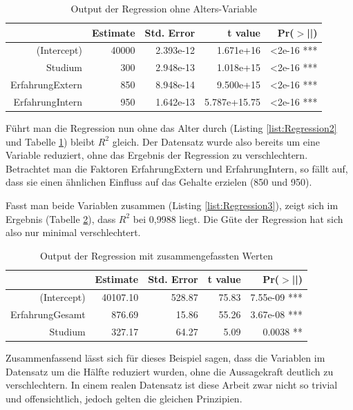 
\begin{table}[h!]
\begin{tabular}{rrrrr}
  \hline
 & Estimate & Std. Error & t value & Pr($>$||) \\ 
  \hline
(Intercept) & 40000 & 2.393e-12 & 1.671e+16 & <2e-16 *** \\ 
  Studium & 300 & 2.948e-13 & 1.018e+15 & <2e-16 *** \\ 
  ErfahrungExtern & 850 & 8.948e-14 & 9.500e+15 & <2e-16 *** \\ 
  ErfahrungIntern & 950 & 1.642e-13 & 5.787e+15.75 & <2e-16 *** \\ 
\hline
\end{tabular}
\caption{Output der Regression ohne Alters-Variable}
\label{tab:Regression2:output}
\end{table}
Führt man die Regression nun ohne das Alter durch (Listing \ref{list:Regression2} und Tabelle \ref{tab:Regression2:output}) bleibt $R^2$ gleich. Der Datensatz wurde also bereits um eine Variable reduziert, ohne das Ergebnis der Regression zu verschlechtern.\newline
Betrachtet man die Faktoren ErfahrungExtern und ErfahrungIntern, so fällt auf, dass sie einen ähnlichen Einfluss auf das Gehalte erzielen (850 und 950). 

Fasst man beide Variablen zusammen (Listing \ref{list:Regression3}), zeigt sich im Ergebnis (Tabelle \ref{tab:Regression3:output}), dass $R^2$ bei 0,9988 liegt. Die Güte der Regression hat sich also nur minimal verschlechtert.
\begin{table}[h!]
\begin{tabular}{rrrrr}
  \hline
 & Estimate & Std. Error & t value & Pr($>$||) \\ 
  \hline
(Intercept) & 40107.10 & 528.87 & 75.83 & 7.55e-09 *** \\
ErfahrungGesamt & 876.69 & 15.86 & 55.26 & 3.67e-08 ***\\ 
Studium & 327.17 & 64.27 & 5.09 & 0.0038 **\\ 
\hline
\end{tabular}
\caption{Output der Regression mit zusammengefassten Werten}
\label{tab:Regression3:output}
\end{table}
Zusammenfassend lässt sich für dieses Beispiel sagen, dass die Variablen im Datensatz um die Hälfte reduziert wurden, ohne die Aussagekraft deutlich zu verschlechtern. In einem realen Datensatz ist diese Arbeit zwar nicht so trivial und offensichtlich, jedoch gelten die gleichen Prinzipien.\newline
